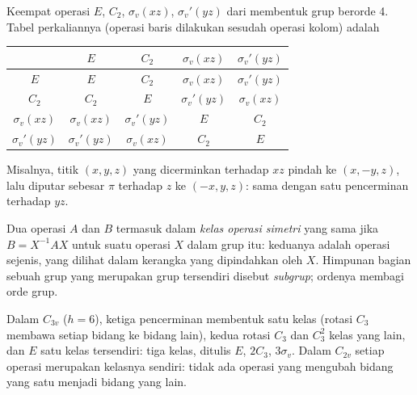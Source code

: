 \begin{example}\label{ex:b3:point-groups:c2v}
Keempat operasi $E$, $C_2$, $\sigma_v(xz)$, $\sigma_v'(yz)$ dari 
membentuk grup berorde 4. Tabel perkaliannya (operasi baris dilakukan
sesudah operasi kolom) adalah
\begin{center}\small
\begin{tabular}{c|cccc}
\hline
 & $E$ & $C_2$ & $\sigma_v(xz)$ & $\sigma_v'(yz)$\\ \hline
$E$ & $E$ & $C_2$ & $\sigma_v(xz)$ & $\sigma_v'(yz)$\\
$C_2$ & $C_2$ & $E$ & $\sigma_v'(yz)$ & $\sigma_v(xz)$\\
$\sigma_v(xz)$ & $\sigma_v(xz)$ & $\sigma_v'(yz)$ & $E$ & $C_2$\\
$\sigma_v'(yz)$ & $\sigma_v'(yz)$ & $\sigma_v(xz)$ & $C_2$ & $E$\\ \hline
\end{tabular}
\end{center}
Misalnya, titik $(x, y, z)$ yang dicerminkan terhadap $xz$ pindah ke
$(x, -y, z)$, lalu diputar sebesar $\pi$ terhadap $z$ ke $(-x, y, z)$: sama
dengan satu pencerminan terhadap $yz$.
\end{example}

\begin{definition}\label{def:b3:point-groups:class}
Dua operasi $A$ dan $B$ termasuk dalam \emph{kelas operasi
simetri} yang sama jika $B = X^{-1}AX$ untuk suatu
operasi $X$ dalam grup itu: keduanya adalah operasi sejenis, yang dilihat
dalam kerangka yang dipindahkan oleh $X$. Himpunan bagian sebuah grup yang
merupakan grup tersendiri disebut \emph{subgrup}; ordenya
membagi orde grup.
\end{definition}

\begin{example}\label{ex:b3:point-groups:classes}
Dalam $C_{3v}$ ($h = 6$), ketiga pencerminan membentuk satu kelas (rotasi
$C_3$ membawa setiap bidang ke bidang lain), kedua rotasi $C_3$ dan $C_3^2$
kelas yang lain, dan $E$ satu kelas tersendiri: tiga kelas, ditulis $E$,
$2C_3$, $3\sigma_v$. Dalam $C_{2v}$ setiap operasi merupakan kelasnya sendiri:
tidak ada operasi yang mengubah bidang yang satu menjadi bidang yang lain.
\end{example}

